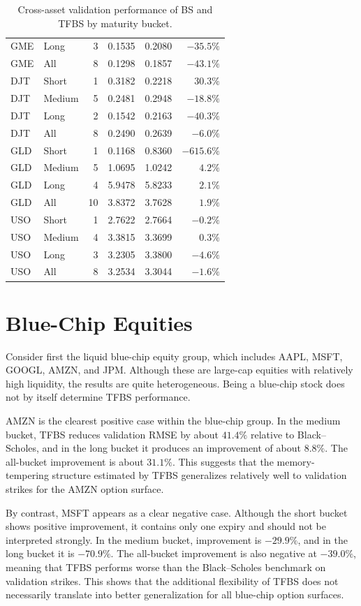 \documentclass[11pt,a4paper]{report}
\begin{document}
\begin{table}[htbp]
\begin{tabular}{llrrrr}
GME & Long   & 3 & 0.1535 & 0.2080 & $-35.5\%$ \\
GME & All    & 8 & 0.1298 & 0.1857 & $-43.1\%$ \\
\midrule
DJT & Short  & 1 & 0.3182 & 0.2218 & $30.3\%$ \\
DJT & Medium & 5 & 0.2481 & 0.2948 & $-18.8\%$ \\
DJT & Long   & 2 & 0.1542 & 0.2163 & $-40.3\%$ \\
DJT & All    & 8 & 0.2490 & 0.2639 & $-6.0\%$ \\
\midrule
GLD & Short  & 1 & 0.1168 & 0.8360 & $-615.6\%$ \\
GLD & Medium & 5 & 1.0695 & 1.0242 & $4.2\%$ \\
GLD & Long   & 4 & 5.9478 & 5.8233 & $2.1\%$ \\
GLD & All    & 10 & 3.8372 & 3.7628 & $1.9\%$ \\
\midrule
USO & Short  & 1 & 2.7622 & 2.7664 & $-0.2\%$ \\
USO & Medium & 4 & 3.3815 & 3.3699 & $0.3\%$ \\
USO & Long   & 3 & 3.2305 & 3.3800 & $-4.6\%$ \\
USO & All    & 8 & 3.2534 & 3.3044 & $-1.6\%$ \\
\bottomrule
\end{tabular}
\caption{Cross-asset validation performance of BS and TFBS by maturity bucket.}
\label{tab:cross_asset_summary}
\end{table}

\section{Blue-Chip Equities}

Consider first the liquid blue-chip equity group, which includes AAPL, MSFT, GOOGL, AMZN, and JPM. Although these are large-cap equities with relatively high liquidity, the results are quite heterogeneous. Being a blue-chip stock does not by itself determine TFBS performance.

AMZN is the clearest positive case within the blue-chip group. In the medium bucket, TFBS reduces validation RMSE by about $41.4\%$ relative to Black--Scholes, and in the long bucket it produces an improvement of about $8.8\%$. The all-bucket improvement is about $31.1\%$. This suggests that the memory-tempering structure estimated by TFBS generalizes relatively well to validation strikes for the AMZN option surface.

By contrast, MSFT appears as a clear negative case. Although the short bucket shows positive improvement, it contains only one expiry and should not be interpreted strongly. In the medium bucket, improvement is $-29.9\%$, and in the long bucket it is $-70.9\%$. The all-bucket improvement is also negative at $-39.0\%$, meaning that TFBS performs worse than the Black--Scholes benchmark on validation strikes. This shows that the additional flexibility of TFBS does not necessarily translate into better generalization for all blue-chip option surfaces.
\end{document}
